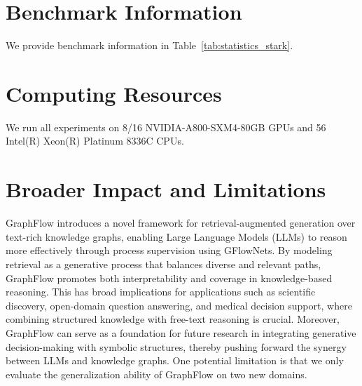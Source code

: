 \documentclass{article}
\begin{document}
\section{Benchmark Information}
We provide benchmark information in Table~\ref{tab:statistics_stark}.



\section{Computing Resources}
We run all experiments on 8/16 NVIDIA-A800-SXM4-80GB GPUs and 56 Intel(R) Xeon(R) Platinum 8336C CPUs.
\section{Broader Impact and Limitations}
GraphFlow introduces a novel framework for retrieval-augmented generation over text-rich knowledge graphs, enabling Large Language Models (LLMs) to reason more effectively through process supervision using GFlowNets. 
By modeling retrieval as a generative process that balances diverse and relevant paths, GraphFlow promotes both interpretability and coverage in knowledge-based reasoning. 
This has broad implications for applications such as scientific discovery, open-domain question answering, and medical decision support, where combining structured knowledge with free-text reasoning is crucial. 
Moreover, GraphFlow can serve as a foundation for future research in integrating generative decision-making with symbolic structures, thereby pushing forward the synergy between LLMs and knowledge graphs.
One potential limitation is that we only evaluate the generalization ability of GraphFlow on two new domains.
\end{document}

